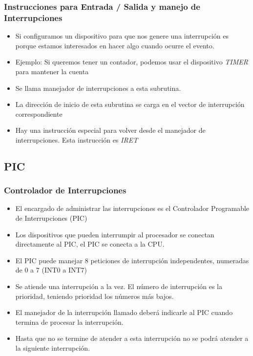 \documentclass{beamer}
\begin{document}
\begin{frame}
\frametitle{Instrucciones para Entrada / Salida y manejo de Interrupciones}

\begin{itemize}

 \item Si configuramos un dispositivo para que nos genere una interrupción es porque estamos interesados en hacer algo cuando ocurre el evento.
 \item Ejemplo: Si queremos tener un contador, podemos usar el dispositivo \emph{TIMER} para mantener la cuenta
 \item Se llama manejador de interrupciones a esta subrutina.
 \item La dirección de inicio de esta subrutina se carga en el vector de interrupción correspondiente
 \item Hay una instrucción especial para volver desde el manejador de interrupciones. Esta instrucción es \emph{IRET}
\end{itemize}

\end{frame}


\subsection{PIC}
\begin{frame}
\frametitle{Controlador de Interrupciones}

\begin{itemize}
 \item El encargado de administrar las interrupciones es el Controlador Programable de Interrupciones (PIC)
 \item Los dispositivos que pueden interrumpir al procesador se conectan directamente al PIC, el PIC se conecta a la CPU.
 \item El PIC puede manejar 8 peticiones de interrupción independentes, numeradas de 0 a 7 (INT0 a INT7)
 \item Se atiende una interrupción a la vez. El número de interrupción es la prioridad, teniendo prioridad los números más bajos.
 \item El manejador de la interrupción llamado deberá indicarle al PIC cuando termina de procesar la interrupción. 
 \item Hasta que no se termine de atender a esta interrupción no se podrá atender a la siguiente interrupción.
\end{itemize}
\end{frame}
\end{document}
